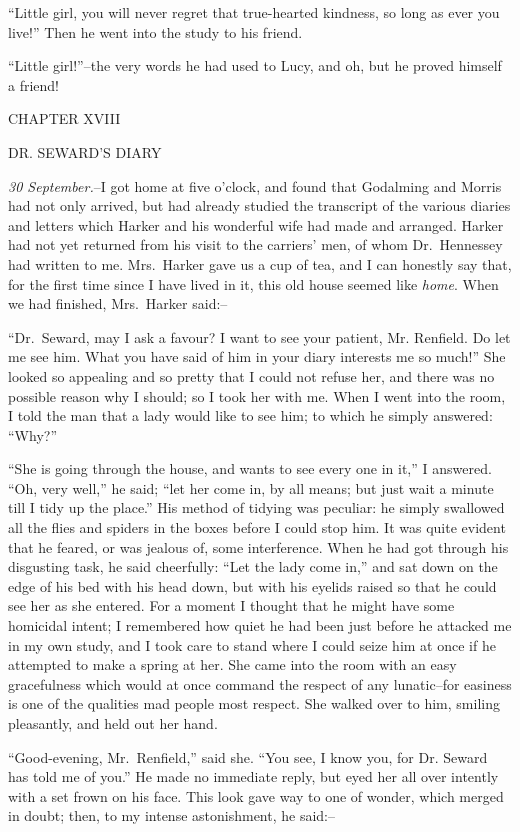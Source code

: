 \documentclass[12pt,openright]{book}
\begin{document}
“Little girl, you will never regret that true-hearted kindness, so long as ever you live!” Then he went into the study to his friend.

“Little girl!”–the very words he had used to Lucy, and oh, but he proved himself a friend!

CHAPTER XVIII

DR. SEWARD’S DIARY

\textit{30 September.}–I got home at five o’clock, and found that Godalming and Morris had not only arrived, but had already studied the transcript of the various diaries and letters which Harker and his wonderful wife had made and arranged. Harker had not yet returned from his visit to the carriers’ men, of whom Dr. Hennessey had written to me. Mrs. Harker gave us a cup of tea, and I can honestly say that, for the first time since I have lived in it, this old house seemed like \textit{home}. When we had finished, Mrs. Harker said:–

“Dr. Seward, may I ask a favour? I want to see your patient, Mr. Renfield. Do let me see him. What you have said of him in your diary interests me so much!” She looked so appealing and so pretty that I could not refuse her, and there was no possible reason why I should; so I took her with me. When I went into the room, I told the man that a lady would like to see him; to which he simply answered: “Why?”

“She is going through the house, and wants to see every one in it,” I answered. “Oh, very well,” he said; “let her come in, by all means; but just wait a minute till I tidy up the place.” His method of tidying was peculiar: he simply swallowed all the flies and spiders in the boxes before I could stop him. It was quite evident that he feared, or was jealous of, some interference. When he had got through his disgusting task, he said cheerfully: “Let the lady come in,” and sat down on the edge of his bed with his head down, but with his eyelids raised so that he could see her as she entered. For a moment I thought that he might have some homicidal intent; I remembered how quiet he had been just before he attacked me in my own study, and I took care to stand where I could seize him at once if he attempted to make a spring at her. She came into the room with an easy gracefulness which would at once command the respect of any lunatic–for easiness is one of the qualities mad people most respect. She walked over to him, smiling pleasantly, and held out her hand.

“Good-evening, Mr. Renfield,” said she. “You see, I know you, for Dr. Seward has told me of you.” He made no immediate reply, but eyed her all over intently with a set frown on his face. This look gave way to one of wonder, which merged in doubt; then, to my intense astonishment, he said:–
\end{document}
